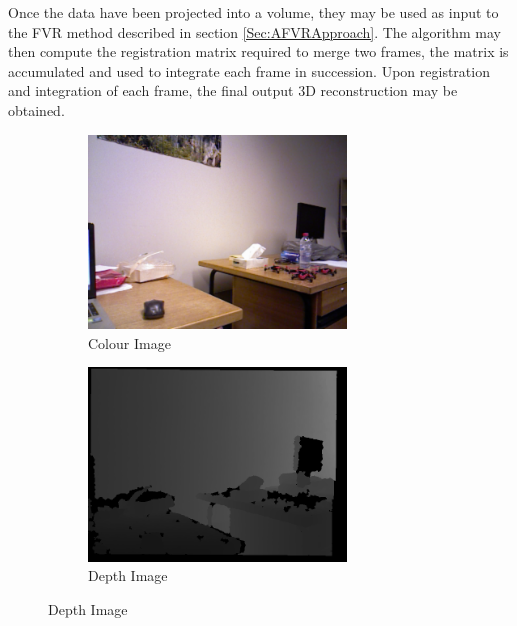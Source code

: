 Once the data have been projected into a volume, they may be used as input to the FVR method described in section \ref{Sec:AFVRApproach}. The algorithm may then compute the registration matrix required to merge two frames, the matrix is accumulated and used to integrate each frame in succession. Upon registration and integration of each frame, the final output 3D reconstruction may be obtained. \\

\begin{figure}[!htb] 
        \centering
        \begin{subfigure}[b]{2.8in}
                \includegraphics[width=2.7in]{images/ch2/colorF11}
                \caption{Colour Image}
                \label{fig:COLEXAMPLE}
        \end{subfigure}%
        \begin{subfigure}[b]{2.8in}
                \includegraphics[width=2.7in]{images/ch2/depthF11}
                \caption{Depth Image}
                \label{fig:DEPTHEXAMPLE}
        \end{subfigure}
        

\end{figure}

